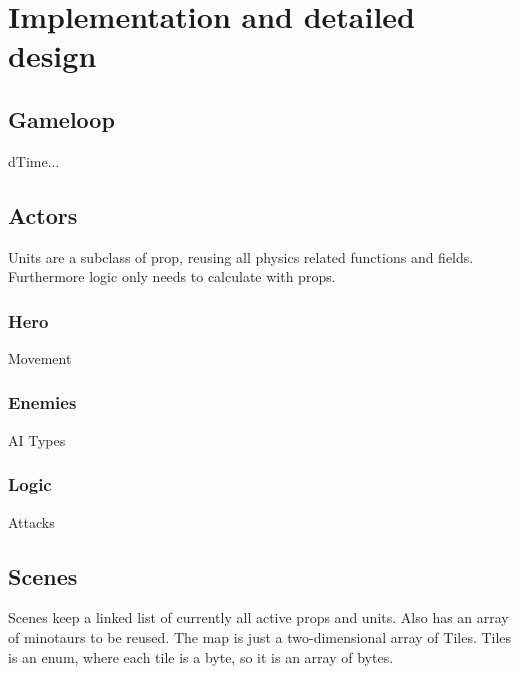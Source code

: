 \chapter{Implementation and detailed design}



\section{Gameloop}
dTime...

\section{Actors}
Units are a subclass of prop, reusing all physics related functions and fields. Furthermore logic only needs to calculate with props.

\subsection{Hero}
Movement

\subsection{Enemies}
AI
Types

\subsection{Logic}
Attacks

\section{Scenes}
Scenes keep a linked list of currently all active props and units.
Also has an array of minotaurs to be reused.
The map is just a two-dimensional array of Tiles. Tiles is an enum, where each tile is a byte, so it is an array of bytes.
